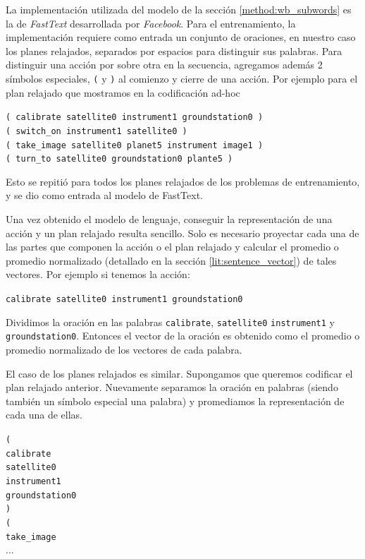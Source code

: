 La implementación utilizada del modelo de la sección \ref{method:wb_subwords} es
la de \emph{FastText} \citep{bojanowski-2017} desarrollada por \emph{Facebook}.
Para el entrenamiento, la implementación requiere como entrada un conjunto de
oraciones, en nuestro caso los planes relajados, separados por espacios para
distinguir sus palabras. Para distinguir una acción por sobre otra en la
secuencia, agregamos además 2 símbolos especiales, \verb|(| y \verb|)| al
comienzo y cierre de una acción. Por ejemplo para el plan relajado que mostramos
en la codificación ad-hoc

\begin{center}
    \verb|( calibrate satellite0 instrument1 groundstation0 )| \\
    \verb|( switch_on instrument1 satellite0 )| \\
    \verb|( take_image satellite0 planet5 instrument image1 )| \\
    \verb|( turn_to satellite0 groundstation0 plante5 )|
\end{center}

Esto se repitió para todos los planes relajados de los problemas de
entrenamiento, y se dio como entrada al modelo de FastText.

Una vez obtenido el modelo de lenguaje, conseguir la representación de una
acción y un plan relajado resulta sencillo. Solo es necesario proyectar cada una
de las partes que componen la acción o el plan relajado y calcular el promedio o
promedio normalizado (detallado en la sección \ref{lit:sentence_vector}) de
tales vectores. Por ejemplo si tenemos la acción:

\begin{center}
    \verb|calibrate satellite0 instrument1 groundstation0|    
\end{center}

Dividimos la oración en las palabras \verb|calibrate|,  \verb|satellite0|
\verb|instrument1| y \verb|groundstation0|. Entonces el vector de la oración es
obtenido como el promedio o promedio normalizado de los vectores de cada
palabra.

El caso de los planes relajados es similar. Supongamos que queremos codificar el
plan relajado anterior. Nuevamente separamos la oración en palabras (siendo
también un símbolo especial una palabra) y promediamos la representación de cada
una de ellas.

\begin{center}
\verb|(| \\
\verb|calibrate| \\
\verb|satellite0| \\
\verb|instrument1| \\
\verb|groundstation0| \\
\verb|)| \\
\verb|(| \\
\verb|take_image| \\
...
\end{center}

